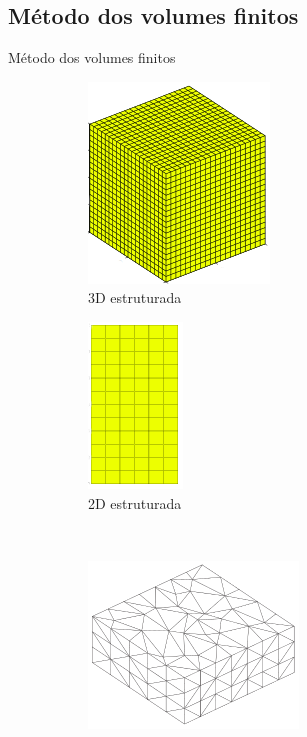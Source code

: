 \documentclass[professionalfont]{beamer}
\begin{document}
\subsection{Método dos volumes finitos}
\begin{frame}{Método dos volumes finitos}
\begin{figure}[!ht]
\centering
    \caption{Exemplos de malhas computacionais}
    \begin{subfigure}[t]{.45\textwidth}
        \centering
        \includegraphics[scale=0.25]{./imgs/im3.png}
        \caption{3D estruturada}
        \label{fig:volumes_finitos1.a}
    \end{subfigure}
    \begin{subfigure}[t]{.45\textwidth}
        \centering
        \includegraphics[scale=0.25]{./imgs/im4.png}
        \caption{2D estruturada}
        \label{fig:volumes_finitos1.b}
    \end{subfigure}
    \\
    \begin{subfigure}{.45\textwidth}
        \centering
        \includegraphics[scale=0.27]{./imgs/im6.png}

\end{subfigure}
\end{figure}
\end{frame}
\end{document}
